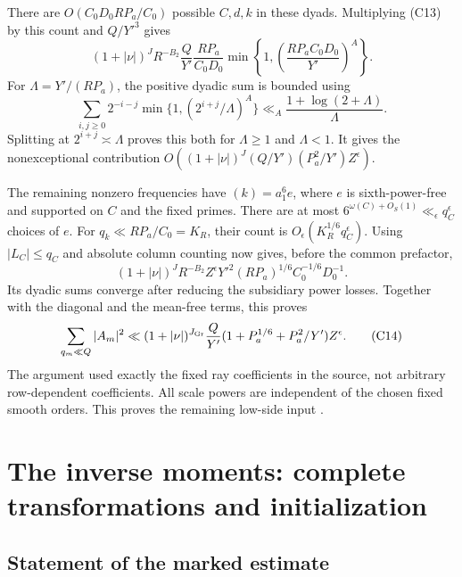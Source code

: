 \documentclass[12pt]{article}
\begin{document}
There are \(O(C_0D_0RP_a/C_0)\) possible \(C,d,k\) in these
dyads.  Multiplying (C13) by this count and \(Q/Y'^3\) gives
\[
 (1+|\nu|)^J R^{-B_2}\frac Q{Y'}
       \frac{RP_a}{C_0D_0}
       \min\left\{1,\left(\frac{RP_aC_0D_0}{Y'}\right)^A\right\}.
\]
For \(\Lambda=Y'/(RP_a)\), the positive dyadic sum is bounded using
\[
 \sum_{i,j\ge0}2^{-i-j}\min\{1,(2^{i+j}/\Lambda)^A\}
       \ll_A\frac{1+\log(2+\Lambda)}{\Lambda}.
\]
Splitting at \(2^{i+j}\asymp\Lambda\) proves this both for
\(\Lambda\ge1\) and \(\Lambda<1\).
It gives the nonexceptional contribution
\(O((1+|\nu|)^J(Q/Y')(P_a^2/Y')Z^\epsilon)\).

The remaining nonzero frequencies have
\((k)=a_1^6e\), where \(e\) is sixth-power-free and supported on
\(C\) and the fixed primes.
There are at most \(6^{\omega(C)+O_S(1)}\ll_\epsilon q_C^\epsilon\)
choices of \(e\).
For \(q_k\ll RP_a/C_0=K_R\), their count is
\(O_\epsilon(K_R^{1/6}q_C^\epsilon)\).
Using \(|L_C|\le q_C\) and absolute column counting now gives,
before the common prefactor,
\[
 (1+|\nu|)^J R^{-B_2}Z^\epsilon
           Y'^2(RP_a)^{1/6}C_0^{-1/6}D_0^{-1}.
\]
Its dyadic sums converge after reducing the subsidiary power
losses.  Together with the diagonal and the mean-free terms,
this proves
\[
 \sum_{q_m\ll Q}|A_m|^2
 \ll (1+|\nu|)^{J_{\rm Gr}}\frac Q{Y'}
            (1+P_a^{1/6}+P_a^2/Y')Z^\epsilon .
 \tag{C14}\label{eq:Gram-proved}
\]
The argument used exactly the fixed ray coefficients in the
source, not arbitrary row-dependent coefficients.
All scale powers are independent of the chosen fixed smooth
orders.  This proves the remaining low-side input
\cite[Proposition 15.2]{QRH}.

\section{The inverse moments: complete transformations and initialization}\label{app:inverse}

\subsection{Statement of the marked estimate}
\end{document}
